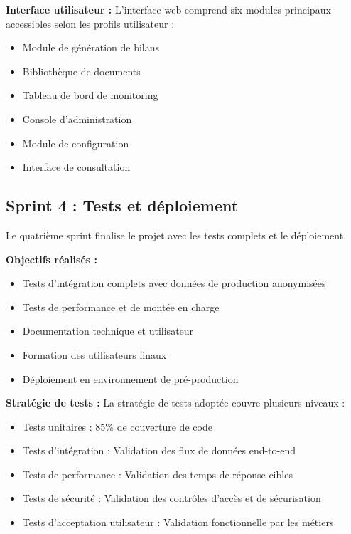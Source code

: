 \textbf{Interface utilisateur :}
L'interface web comprend six modules principaux accessibles selon les profils utilisateur :
\begin{itemize}
    \item Module de génération de bilans
    \item Bibliothèque de documents
    \item Tableau de bord de monitoring
    \item Console d'administration
    \item Module de configuration
    \item Interface de consultation
\end{itemize}

\subsection{Sprint 4 : Tests et déploiement}

Le quatrième sprint finalise le projet avec les tests complets et le déploiement.

\medskip

\textbf{Objectifs réalisés :}
\begin{itemize}
    \item Tests d'intégration complets avec données de production anonymisées
    \item Tests de performance et de montée en charge
    \item Documentation technique et utilisateur
    \item Formation des utilisateurs finaux
    \item Déploiement en environnement de pré-production
\end{itemize}

\textbf{Stratégie de tests :}
La stratégie de tests adoptée couvre plusieurs niveaux :
\begin{itemize}
    \item Tests unitaires : 85\% de couverture de code
    \item Tests d'intégration : Validation des flux de données end-to-end
    \item Tests de performance : Validation des temps de réponse cibles
    \item Tests de sécurité : Validation des contrôles d'accès et de sécurisation
    \item Tests d'acceptation utilisateur : Validation fonctionnelle par les métiers
\end{itemize}

